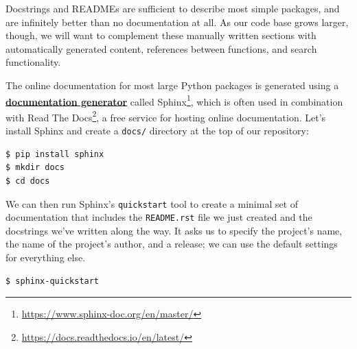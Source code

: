 \documentclass[
]{krantz}
\renewcommand{\href}[2]{#2\footnote{\url{#1}}}
\newcommand{\gref}[2]{\hyperlink{#2}{\textbf{#1}}}
\begin{document}
Docstrings and READMEs are sufficient to describe most simple packages,
and are infinitely better than no documentation at all.
As our code base grows larger,
though,
we will want to complement these manually written sections with automatically generated content,
references between functions,
and search functionality.

The online documentation for most large Python packages
is generated using a \gref{documentation generator}{documentation\_generator}
called \href{https://www.sphinx-doc.org/en/master/}{Sphinx},
which is often used in combination with \href{https://docs.readthedocs.io/en/latest/}{Read The Docs},
a free service for hosting online documentation.
Let's install Sphinx and create a \texttt{docs/} directory at the top of our repository:

\begin{verbatim}
$ pip install sphinx
$ mkdir docs
$ cd docs
\end{verbatim}

We can then run Sphinx's \texttt{quickstart} tool to create a minimal set of documentation
that includes the \texttt{README.rst} file we just created
and the docstrings we've written along the way.
It asks us to specify the project's name,
the name of the project's author,
and a release;
we can use the default settings for everything else.

\begin{verbatim}
$ sphinx-quickstart
\end{verbatim}
\end{document}
